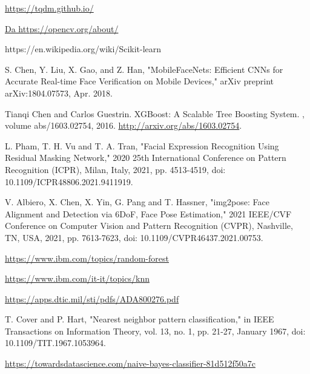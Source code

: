 \begin{thebibliography}{9}
     \url{https://tqdm.github.io/}
    
     \url{Da https://opencv.org/about/}
    
     {https://en.wikipedia.org/wiki/Scikit-learn}
    
     S. Chen, Y. Liu, X. Gao, and Z. Han, "MobileFaceNets: Efficient CNNs for Accurate Real-time Face Verification on Mobile Devices," arXiv preprint arXiv:1804.07573, Apr. 2018.
    
    Tianqi Chen and Carlos Guestrin.
    \newblock XGBoost: {A} Scalable Tree Boosting System.
    , volume abs/1603.02754, 2016.
    \newblock \url{http://arxiv.org/abs/1603.02754}.
    
    L. Pham, T. H. Vu and T. A. Tran, "Facial Expression Recognition Using Residual Masking Network," 2020 25th International Conference on Pattern Recognition (ICPR), Milan, Italy, 2021, pp. 4513-4519, doi: 10.1109/ICPR48806.2021.9411919.
    
    V. Albiero, X. Chen, X. Yin, G. Pang and T. Hassner, "img2pose: Face Alignment and Detection via 6DoF, Face Pose Estimation," 2021 IEEE/CVF Conference on Computer Vision and Pattern Recognition (CVPR), Nashville, TN, USA, 2021, pp. 7613-7623, doi: 10.1109/CVPR46437.2021.00753.
    
     \url{https://www.ibm.com/topics/random-forest}
    
     \url{https://www.ibm.com/it-it/topics/knn}
    
     \url{https://apps.dtic.mil/sti/pdfs/ADA800276.pdf}
    
    T. Cover and P. Hart, "Nearest neighbor pattern classification," in IEEE Transactions on Information Theory, vol. 13, no. 1, pp. 21-27, January 1967, doi: 10.1109/TIT.1967.1053964.
    
     \url{https://towardsdatascience.com/naive-bayes-classifier-81d512f50a7c}

\end{thebibliography}
